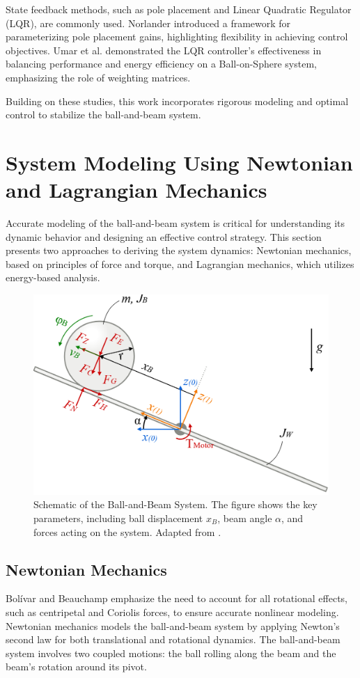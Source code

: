 \documentclass[conference]{IEEEtran}
\begin{document}
State feedback methods, such as pole placement and Linear Quadratic Regulator (LQR), are commonly used. Norlander \cite{norlaner2003} introduced a framework for parameterizing pole placement gains, highlighting flexibility in achieving control objectives. Umar et al. \cite{umar2022} demonstrated the LQR controller's effectiveness in balancing performance and energy efficiency on a Ball-on-Sphere system, emphasizing the role of weighting matrices.

Building on these studies, this work incorporates rigorous modeling and optimal control to stabilize the ball-and-beam system.


\section{System Modeling Using Newtonian and Lagrangian Mechanics}
\label{sec:modeling}
Accurate modeling of the ball-and-beam system is critical for understanding its dynamic behavior and designing an effective control strategy. This section presents two approaches to deriving the system dynamics: Newtonian mechanics, based on principles of force and torque, and Lagrangian mechanics, which utilizes energy-based analysis.

\begin{figure}[H]
    \centering
    \includegraphics[width=0.8\linewidth]{Figures/system_diag_wiki_right.PNG}
    \caption{Schematic of the Ball-and-Beam System. The figure shows the key parameters, including ball displacement \(x_B\), beam angle \(\alpha\), and forces acting on the system. Adapted from \cite{mager2015}.}
    \label{fig:ball_beam_schematic}
\end{figure}


\subsection{Newtonian Mechanics}
Bolívar and Beauchamp \cite{bolivar2014} emphasize the need to account for all rotational effects, such as centripetal and Coriolis forces, to ensure accurate nonlinear modeling.
\label{subsec:model_newtonian}
Newtonian mechanics models the ball-and-beam system by applying Newton's second law for both translational and rotational dynamics. The ball-and-beam system involves two coupled motions: the ball rolling along the beam and the beam's rotation around its pivot.
\end{document}
